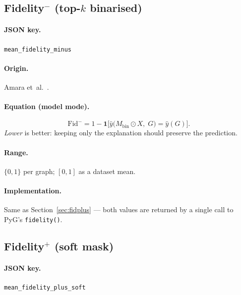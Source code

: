 \documentclass[11pt,a4paper]{article}
\newcommand{\code}[1]{\texttt{#1}}
\newcommand{\jsonkey}[1]{\texttt{#1}}
\begin{document}
\subsection{Fidelity\texorpdfstring{$^-$}{-} (top-$k$ binarised)}
\label{sec:fidminus}

\paragraph{JSON key.} \jsonkey{mean\_fidelity\_minus}

\paragraph{Origin.} Amara et~al.~\cite{amara2022graphframex}.

\paragraph{Equation (model mode).}
\begin{equation}
  \mathrm{Fid}^{-} = 1 - \mathbf{1}\bigl[\hat{y}\bigl(
    M_{\mathrm{bin}} \odot X,\; G\bigr) = \hat{y}(G)\bigr].
  \label{eq:fidminus}
\end{equation}
\emph{Lower} is better: keeping only the explanation should preserve the
prediction.

\paragraph{Range.} $\{0, 1\}$ per graph; $[0,1]$ as a dataset mean.

\paragraph{Implementation.} Same as Section~\ref{sec:fidplus} — both
values are returned by a single call to PyG's \code{fidelity()}.


\subsection{Fidelity\texorpdfstring{$^+$}{+} (soft mask)}
\label{sec:fidplussoft}

\paragraph{JSON key.} \jsonkey{mean\_fidelity\_plus\_soft}
\end{document}
